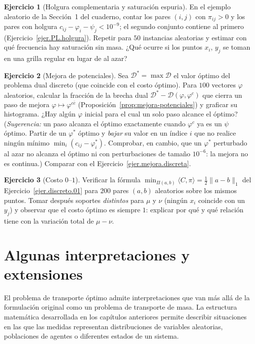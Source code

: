 \documentclass[12pt, a4paper]{amsbook}
\theoremstyle{remark}
\theoremstyle{definition}
\newtheorem{ejercicio}{Ejercicio}[chapter]
\numberwithin{section}{chapter}
\numberwithin{subsection}{section}
\numberwithin{equation}{section}
\numberwithin{figure}{chapter}
\begin{document}
\begin{ejercicio}[Holgura complementaria y saturación espuria]\label{ejc.dual.holgura}
En el ejemplo aleatorio de la Sección~1 del cuaderno, contar los pares $(i,j)$
con $\pi_{ij}>0$ y los pares con holgura $c_{ij}-\varphi_i-\psi_j<10^{-9}$; el
segundo conjunto contiene al primero (Ejercicio~\ref{ejer.PL.holgura}).
Repetir para $50$ instancias aleatorias y estimar con qué frecuencia hay
saturación sin masa. ¿Qué ocurre si los puntos $x_i$, $y_j$ se toman en una
grilla regular en lugar de al azar?
\end{ejercicio}

\begin{ejercicio}[Mejora de potenciales]\label{ejc.dual.mejora}
Sea $\mathcal D^*=\max\mathcal D$ el valor óptimo del problema dual discreto
(que coincide con el costo óptimo). Para $100$ vectores $\varphi$ aleatorios,
calcular la fracción de la brecha
dual $\mathcal D^*-\mathcal D(\varphi,\varphi^c)$ que cierra un paso de mejora
$\varphi\mapsto\varphi^{c\bar c}$ (Proposición~\ref{prop:mejora-potenciales})
y graficar su histograma. ¿Hay algún $\varphi$ inicial para el cual un solo
paso alcance el óptimo? (\emph{Sugerencia:} un paso alcanza el óptimo
exactamente cuando $\varphi^c$ ya es un $\psi$ óptimo. Partir de un
$\varphi^*$ óptimo y \emph{bajar} su valor en un índice $i$ que no realice
ningún mínimo $\min_i(c_{ij}-\varphi^*_i)$. Comprobar, en cambio, que un
$\varphi^*$ perturbado al azar no alcanza el óptimo ni con perturbaciones de
tamaño $10^{-6}$: la mejora no es continua.) Comparar con el
Ejercicio~\ref{ejer.mejora.discreta}.
\end{ejercicio}

\begin{ejercicio}[Costo $0$--$1$]\label{ejc.dual.01}
Verificar la fórmula $\min_{\Pi(a,b)}\langle C,\pi\rangle=\frac12\|a-b\|_1$
del Ejercicio~\ref{ejer.discreto.01} para $200$ pares $(a,b)$ aleatorios
sobre los mismos puntos. Tomar después soportes \emph{distintos} para $\mu$ y
$\nu$ (ningún $x_i$ coincide con un $y_j$) y observar que el costo óptimo es
siempre $1$: explicar por qué y qué relación tiene con la variación total de
$\mu-\nu$.
\end{ejercicio}

\chapter{Algunas interpretaciones y extensiones}\label{cap.interpretaciones}


El problema de transporte óptimo admite interpretaciones que van más allá de
la formulación original como un problema de transporte de masa. La estructura
matemática desarrollada en los capítulos anteriores permite describir
situaciones en las que las medidas representan distribuciones de variables
aleatorias, poblaciones de agentes o diferentes estados de un sistema.
 
\end{document}
